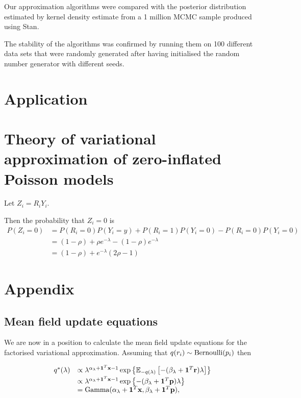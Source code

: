 \documentclass{article}[12pt]
\begin{document}
Our approximation algorithms were compared with the posterior distribution estimated
by kernel density estimate from a 1 million MCMC sample produced using Stan.

\noindent The stability of the algorithms was confirmed by running them on 100 different
data sets that were randomly generated after having initialised the random number
generator with different seeds.



\section{Application}\label{sec:application}

\section{Theory of variational approximation of zero-inflated Poisson models}
Let $Z_i = R_i Y_i$.

Then the probability that $Z_i = 0$ is
$$
\begin{array}{rl}
P(Z_i = 0) &= P(R_i = 0)P(Y_i = y) + P(R_i = 1) P(Y_i = 0) - P(R_i = 0) P(Y_i = 0) \\
&= (1 - \rho) + \rho e^{-\lambda} - (1 - \rho) e^{-\lambda} \\
&= (1 - \rho) + e^{-\lambda}(2 \rho - 1)
\end{array}
$$

\section{Appendix} 

\subsection{Mean field update equations}
We are now in a position to calculate the mean field update equations for the factorised
variational approximation. Assuming that $q(r_i) \sim \text{Bernoulli} (p_i)$ then

$$
\begin{array}{rl}
q^*(\lambda)
    & \propto 
    \lambda^{\alpha_\lambda+{\bf 1}^T{\bf x} - 1} 
    \exp\left\{ 
    {\mathbb E}_{-q(\lambda)} \left[
    -(\beta_\lambda + {\bf 1}^T{\bf r}) \lambda 
    \right] 
    \right\} 
    \\ [0.5ex]
    &
    \propto \lambda^{\alpha_\lambda+{\bf 1}^T{\bf x} - 1} \exp{\left \{-(\beta_\lambda + {\bf1}^T{\bf p})\lambda \right \} } 
\\
    & = \text{Gamma} (\alpha_\lambda+{\bf 1}^T{\bf x}, \beta_\lambda+{\bf 1}^T{\bf p}),
\end{array}
$$
\end{document}

